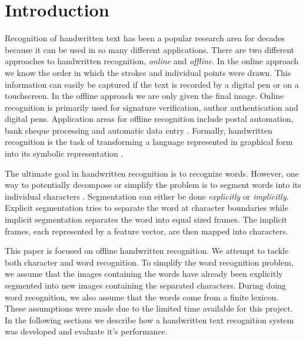 \section{Introduction}

Recognition of handwritten text has been a popular research area for decades because it can be used in so many different applications.
There are two different approaches to handwritten recognition, \textit{online} and \textit{offline}.
In the online approach we know the order in which the strokes and individual points were drawn.
This information can easily be captured if the text is recorded by a digital pen or on a touchscreen.
In the offline approach we are only given the final image.
Online recognition is primarily used for signature verification, author authentication and digital pens.
Application areas for offline recognition include postal automation, bank cheque processing and automatic data entry \cite{intro1}.
Formally, handwritten recognition is the task of transforming a language represented in graphical form into its symbolic representation \cite{introsurvey}.

The ultimate goal in handwritten recognition is to recognize words.
However, one way to potentially decompose or simplify the problem is to segment words into its individual characters \cite{intro-Yacoubi}. 
Segmentation can either be done \textit{explicitly} or \textit{implicitly}.
Explicit segmentation tries to separate the word at character boundaries while implicit segmentation separates the word into equal sized frames.
The implicit frames, each represented by a feature vector, are then mapped into characters.

This paper is focused on offline handwritten recognition.
We attempt to tackle both character and word recognition.
To simplify the word recognition problem, we assume that the images containing the words have already been explicitly segmented into new images containing the separated characters.
During doing word recognition, we also assume that the words come from a finite lexicon.
These assumptions were made due to the limited time available for this project.
In the following sections we describe how a handwritten text recognition system was developed and evaluate it's performance.


